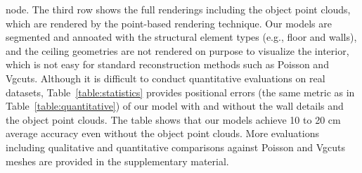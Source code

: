 node. The third row shows the full renderings including the object point
clouds, which are rendered by the point-based rendering technique. Our
models are segmented and annoated with the structural element types
(e.g., floor and walls), and the ceiling geometries are not rendered on
purpose to visualize the interior, which is not easy for standard
reconstruction methods such as Poisson and Vgcuts.
%
%
%
%
Although it is difficult to conduct quantitative evaluations on real
datasets, Table~\ref{table:statistics} provides positional errors (the
same metric as in Table~\ref{table:quantitative}) of our model with and
without the wall details and the object point clouds.
The table shows that our models achieve 10 to 20 cm average accuracy
even without the object point clouds.
%
More evaluations including qualitative and quantitative comparisons
against Poisson and Vgcuts meshes are provided in the supplementary
material.







